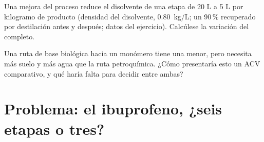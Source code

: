 \begin{exercise}[$\star\star\star$]\label{exo:b3:green-industrial:11}
Una mejora del proceso reduce el disolvente de una etapa de 20 L a 5 L por kilogramo de
producto (densidad del disolvente, \qty{0.80}{kg/L}; un 90\,\% recuperado por destilación antes y después; datos
del ejercicio). Calcúlese la variación del  completo.
\end{exercise}

\begin{exercise}[$\star\star\star$]\label{exo:b3:green-industrial:12}
Una ruta de base biológica hacia un monómero tiene una  menor, pero necesita más suelo
y más agua que la ruta petroquímica. ¿Cómo presentaría esto un ACV comparativo,
y qué haría falta para decidir entre ambas?
\end{exercise}

\section{Problema: el ibuprofeno, ¿seis etapas o tres?}

